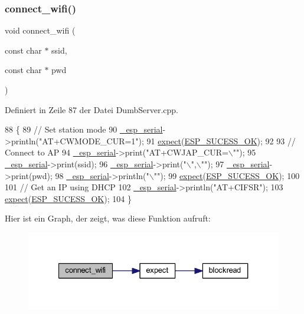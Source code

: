 \subsubsection{\texorpdfstring{connect\+\_\+wifi()}{connect\_wifi()}}
{\footnotesize\ttfamily void connect\+\_\+wifi (\begin{DoxyParamCaption}\item[{const char $\ast$}]{ssid,  }\item[{const char $\ast$}]{pwd }\end{DoxyParamCaption})\hspace{0.3cm}{\ttfamily [private]}}



Definiert in Zeile 87 der Datei Dumb\+Server.\+cpp.


\begin{DoxyCode}
88 \{
89   \textcolor{comment}{// Set station mode}
90   \hyperlink{class_esp_server_a552aab874ad99b696f4c997d6f5a4746}{\_esp\_serial}->println(\textcolor{stringliteral}{"AT+CWMODE\_CUR=1"});
91   \hyperlink{class_esp_server_aff5ea67ab96af075223b2b836036ccf1}{expect}(\hyperlink{_dumb_server_8cpp_a62497fcb12b1cedd5fdfbc0755508d87}{ESP\_SUCESS\_OK});
92 
93   \textcolor{comment}{// Connect to AP}
94   \hyperlink{class_esp_server_a552aab874ad99b696f4c997d6f5a4746}{\_esp\_serial}->print(\textcolor{stringliteral}{"AT+CWJAP\_CUR=\(\backslash\)""});
95   \hyperlink{class_esp_server_a552aab874ad99b696f4c997d6f5a4746}{\_esp\_serial}->print(ssid);
96   \hyperlink{class_esp_server_a552aab874ad99b696f4c997d6f5a4746}{\_esp\_serial}->print(\textcolor{stringliteral}{"\(\backslash\)",\(\backslash\)""});
97   \hyperlink{class_esp_server_a552aab874ad99b696f4c997d6f5a4746}{\_esp\_serial}->print(pwd);
98   \hyperlink{class_esp_server_a552aab874ad99b696f4c997d6f5a4746}{\_esp\_serial}->println(\textcolor{stringliteral}{"\(\backslash\)""});
99   \hyperlink{class_esp_server_aff5ea67ab96af075223b2b836036ccf1}{expect}(\hyperlink{_dumb_server_8cpp_a62497fcb12b1cedd5fdfbc0755508d87}{ESP\_SUCESS\_OK});
100 
101   \textcolor{comment}{// Get an IP using DHCP}
102   \hyperlink{class_esp_server_a552aab874ad99b696f4c997d6f5a4746}{\_esp\_serial}->println(\textcolor{stringliteral}{"AT+CIFSR"});
103   \hyperlink{class_esp_server_aff5ea67ab96af075223b2b836036ccf1}{expect}(\hyperlink{_dumb_server_8cpp_a62497fcb12b1cedd5fdfbc0755508d87}{ESP\_SUCESS\_OK});
104 \}
\end{DoxyCode}
Hier ist ein Graph, der zeigt, was diese Funktion aufruft\+:\nopagebreak
\begin{figure}[H]
\begin{center}
\leavevmode
\includegraphics[width=327pt]{class_esp_server_a504393c8aa6394b2d0631146425bf011_cgraph}
\end{center}
\end{figure}

